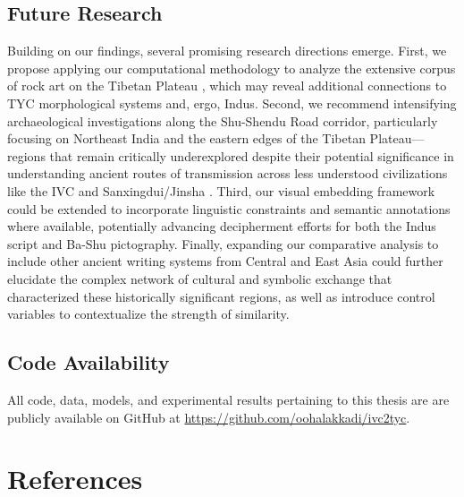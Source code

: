 \documentclass[11pt,a4paper,oneside]{report}
\begin{document}
\section{Future Research}
\noindent\hspace{1cm}
Building on our findings, several promising research directions emerge. First, we propose applying our computational methodology to analyze the extensive corpus of rock art on the Tibetan Plateau \cite{bellezza_comprehensive_2023}, which may reveal additional connections to TYC morphological systems and, ergo, Indus. Second, we recommend intensifying archaeological investigations along the Shu-Shendu Road corridor, particularly focusing on Northeast India and the eastern edges of the Tibetan Plateau—regions that remain critically underexplored despite their potential significance in understanding ancient routes of transmission across less understood civilizations like the IVC and Sanxingdui/Jinsha \cite{ma_understanding_2023}. Third, our visual embedding framework could be extended to incorporate linguistic constraints and semantic annotations where available, potentially advancing decipherment efforts for both the Indus script and Ba-Shu pictography. Finally, expanding our comparative analysis to include other ancient writing systems from Central and East Asia could further elucidate the complex network of cultural and symbolic exchange that characterized these historically significant regions, as well as introduce control variables to contextualize the strength of similarity.

\section{Code Availability}
\noindent\hspace{1cm}
All code, data, models, and experimental results pertaining to this thesis are are publicly available on GitHub at \url{https://github.com/oohalakkadi/ivc2tyc}.

\chapter*{References}
\label{references}

\printbibliography[heading=none]

\end{document}
